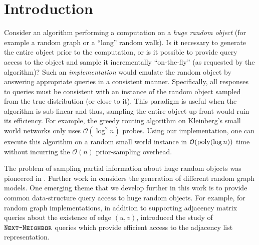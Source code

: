 \section{Introduction}
Consider an algorithm performing a computation on a \emph{huge random object} (for example a random graph or a ``long'' random walk).
Is it necessary to generate the entire object prior to the computation,
or is it possible to provide query access to the object and sample it incrementally ``on-the-fly'' (as requested by the algorithm)?
Such an \emph{implementation} would emulate the random object by answering appropriate queries in a consistent manner.
Specifically, all responses to queries must be consistent with an instance of the random object sampled from the true distribution (or close to it).
This paradigm is useful when the algorithm is sub-linear and thus, sampling the entire object up front would ruin its efficiency.
For example, the greedy routing algorithm on Kleinberg's small world networks \cite{kleinberg} only uses $\mathcal O(\log^2 n)$ probes.
Using our implementation, one can execute this algorithm on a random small world instance
in $\mathcal O(\mathrm{poly}(\log n))$ time without incurring the $\mathcal O(n)$ prior-sampling overhead.

The problem of sampling partial information about huge random objects was pioneered in \cite{huge_old,huge}.
Further work in \cite{sparse,reut} considers the generation of different random graph models.
One emerging theme that we develop further in this work is to provide common data-structure query access to huge random objects.
For example, for random graph implementations, in addition to supporting adjacency matrix queries about the existence of edge $(u,v)$,
\cite{reut} introduced the study of $\texttt{\textsc{Next-Neighbor}}$ queries which provide efficient access to the adjacency list representation.





